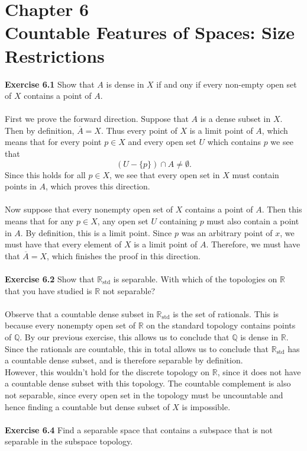 \documentclass[a4paper,12pt,twoside]{hmcpset}
\begin{document}
\section*{Chapter 6\\ Countable Features of Spaces: Size Restrictions}

\textbf{Exercise 6.1} Show that $A$ is dense in $X$ if and ony if every 
non-empty open set of $X$ contains a point of $A$.
\\
\\
First we prove the forward direction. Suppose that $A$ is a dense subset in 
$X$. Then by definition, $\overline{A} = X$. Thus every point of $X$ 
is a limit point of $A$, which means that for every point $p \in X$ and 
every open set $U$ which contains $p$ we see that 
$$
(U - \{p\})\cap A \ne \emptyset.
$$
Since this holds for all $p \in X$, we see that every open set in $X$ must 
contain points in $A$, which proves this direction.
\\
\\
Now suppose that every nonempty open set of $X$ contains a point of $A$. 
Then this means that for any $p \in X$, any open set $U$ containing $p$ 
must also contain a point in $A$. By definition, this is a limit point.
Since $p$ was an arbitrary point of $x$, we must have that every element 
of $X$ is a limit point of $A$. Therefore, we must have that 
$\overline{A} = X$, which finishes the proof in this direction. 
\\
\\
\textbf{Exercise 6.2} Show that $\mathbb{R}_{\text{std}}$ is separable.
With which of the topologies on $\mathbb{R}$ that you have studied is
$\mathbb{R}$ not separable?
\\
\\
Observe that a countable dense subset in $\mathbb{R}_{\text{std}}$ is the 
set of rationals. This is because every nonempty open set of $\mathbb{R}$
on the standard topology contains points of $\mathbb{Q}$. By our previous 
exercise, this allows us to conclude that $\mathbb{Q}$ is dense in $\mathbb{R}$.
Since the rationals are countable, this in total allows us to conclude that 
$\mathbb{R}_{\text{std}}$ has a countable dense subset, and is therefore 
separable by definition. \\
However, this wouldn't hold for the discrete 
topology on $\mathbb{R}$, since it does not have a countable dense subset 
with this topology. The countable complement is also not separable, since 
every open set in the topology must be uncountable and hence finding a 
countable but dense subset of $X$ is impossible.
\\
\\
\textbf{Exercise 6.4} Find a separable space that contains a subspace that 
is not separable in the subspace topology.
\end{document}
